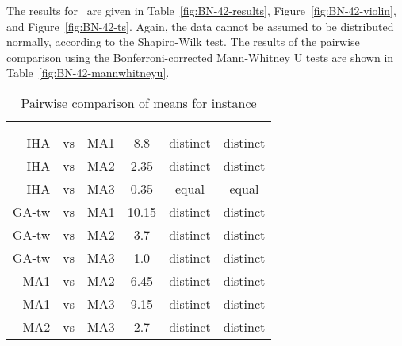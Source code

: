 \documentclass[thesis.tex]{subfiles}
\begin{document}
\subsubsection{}
   \renewcommand{\CurrentInstance}{\Instance{BN\textunderscore{}42}}
   \renewcommand{\CurrentInstanceFileEscaped}{BN-42}
   \renewcommand{\CurrentInstanceTexEscaped}{BN\textunderscore{}42}



The results for \CurrentInstance\ are given in Table~\vref{fig:BN-42-results}, Figure~\vref{fig:BN-42-violin}, and Figure~\vref{fig:BN-42-ts}. Again, the data cannot be assumed to be distributed normally, according to the Shapiro-Wilk test. The results of the pairwise comparison using the Bonferroni-corrected Mann-Whitney U tests are shown in Table~\vref{fig:BN-42-mannwhitneyu}.
\begin{table}[htbp]
   \caption{Pairwise comparison of means for instance \CurrentInstance}
   \label{fig:\CurrentInstanceFileEscaped-mannwhitneyu}
   \centering\small
      \begin{tabular}{r@{\ }c@{\ }l S[table-format=2.2] c c} \toprule
         &&&                          &  \\ \cmidrule(lr){5-6}
         &&&  &  &  \\ \midrule

         \gls{IHA} &vs& \gls{MA1}   &  8.8  & distinct & distinct \\
         \gls{IHA} &vs& \gls{MA2}   &  2.35 & distinct & distinct \\
         \gls{IHA} &vs& \gls{MA3}   &  0.35 &  equal   &  equal   \\
         \gls{GA-tw} &vs& \gls{MA1} & 10.15 & distinct & distinct \\
         \gls{GA-tw} &vs& \gls{MA2} &  3.7  & distinct & distinct \\
         \gls{GA-tw} &vs& \gls{MA3} &  1.0  & distinct & distinct \\
         \gls{MA1} &vs& \gls{MA2}   &  6.45 & distinct & distinct \\
         \gls{MA1} &vs& \gls{MA3}   &  9.15 & distinct & distinct \\
         \gls{MA2} &vs& \gls{MA3}   &  2.7  & distinct & distinct \\
         \bottomrule
      \end{tabular}
\end{table}
\end{document}
